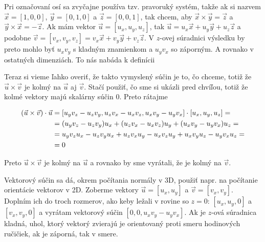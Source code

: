 \documentclass[10pt]{article}
\def\ods{\vspace*{10pt}}
\begin{document}
{{}

\ods
Pri označovaní osí sa zvyčajne používa tzv. pravoruký systém, takže ak si nazvem
$\vec x=[1,0,0]$, $\vec y=[0,1,0]$ a $\vec z=[0,0,1]$, tak chcem, aby
$\vec x\times\vec y = \vec z$ a $\vec y\times\vec x=-\vec z$.
Ak mám vektor $\vec u=[u_x,u_y,u_z]$, tak 
$\vec u = u_x\vec x+ u_y\vec y+u_z\vec z$ a podobne
$\vec v = [v_x,v_y,v_z] = v_x\vec x+ v_y\vec y+v_z\vec z$.
V $z$-ovej súradnici výsledku by preto mohlo byť $u_xv_y$ s kladným znamienkom 
a $u_yv_x$ so záporným. A rovnako v ostatných dimenziách. To nás nabáda k definícii

\ods
\centerline{\fbox{$
[u_x,u_y,u_z]\times[v_x,v_y,v_z]=[
  u_yv_z-u_zv_y, 
  u_zv_x-u_xv_z, 
  u_xv_y-u_yv_x
]
$}}

\ods
Teraz si vieme ľahko overiť, že takto vymyslený súčin je to, čo chceme, totiž že
$\vec u\times\vec v$ je kolmý na $\vec u$ aj $\vec v$. Stačí použiť, čo sme si ukázli
pred chvíľou, totiž že kolmé vektory majú skalárny súčin $0$.
Preto rátajme


\tikzexternaldisable
\def\nd#1#2{\tikz[remember picture,baseline=(#1.base)]\node[draw=none, inner sep=0pt, outer sep=0pt](#1){\ensuremath{#2}};}

\begin{align*}
  (\vec u\times\vec v)\cdot \vec u &= 
[ u_yv_z-u_zv_y,u_zv_x-u_xv_z, u_xv_y-u_yv_x]\cdot[u_x,u_y,u_z] =\\
  &= (u_yv_z-u_zv_y)u_x+(u_zv_x-u_xv_z)u_y+( u_xv_y-u_yv_x)u_z = \\
  &= \nd{a}{u_yv_zu_x} - \nd{b}{u_zv_yu_x} + \nd{c}{u_zv_xu_y} 
    - \nd{d}{u_xv_zu_y} + \nd{e}{u_xv_yu_z} - \nd{f}{u_yv_xu_z} = \\
  &=0
\end{align*}
\tikzexternalenable

Preto $\vec u\times\vec v$ je kolmý na $\vec u$ a rovnako by sme vyrátali,
že je kolmý na $\vec v$.

\ods
Vektorový súčin sa dá, okrem počítania normály v 3D, použiť napr. na počítanie orientácie vektorov v 2D.
Zoberme vektory $\vec u=[u_x,u_y]$ a $\vec v=[v_x,v_y]$. Doplním ich do troch rozmerov, ako keby ležali v rovine
so $z=0$: $[u_x,u_y,0]$ a $[v_x,v_y,0]$ a vyrátam vektorový súčin $[0,0,u_xv_y-u_yv_x]$. Ak je $z$-ová súradnica
kladná, uhol, ktorý vektorý zvierajú je orientovaný proti smeru hodinových ručičiek, ak je záporná, tak v smere.

}
\end{document}
